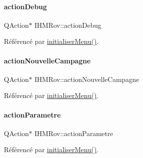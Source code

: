 \mbox{\label{class_i_h_m_rov_abf3ebd717e5d59355dd271917962083f}} 
\paragraph{\texorpdfstring{action\+Debug}{actionDebug}}
{\footnotesize\ttfamily Q\+Action$\ast$ I\+H\+M\+Rov\+::action\+Debug\hspace{0.3cm}{\ttfamily [private]}}



Référencé par \hyperlink{class_i_h_m_rov_aebbcb2325c2d1a88a012d8408e2d6223}{initialiser\+Menu()}.

\mbox{\label{class_i_h_m_rov_a1ea738e5224f6fa4fc61ac064b5d9a6e}} 
\paragraph{\texorpdfstring{action\+Nouvelle\+Campagne}{actionNouvelleCampagne}}
{\footnotesize\ttfamily Q\+Action$\ast$ I\+H\+M\+Rov\+::action\+Nouvelle\+Campagne\hspace{0.3cm}{\ttfamily [private]}}



Référencé par \hyperlink{class_i_h_m_rov_aebbcb2325c2d1a88a012d8408e2d6223}{initialiser\+Menu()}.

\mbox{\label{class_i_h_m_rov_aa1864bc274cc5662b212a3530255e4ad}} 
\paragraph{\texorpdfstring{action\+Parametre}{actionParametre}}
{\footnotesize\ttfamily Q\+Action$\ast$ I\+H\+M\+Rov\+::action\+Parametre\hspace{0.3cm}{\ttfamily [private]}}



Référencé par \hyperlink{class_i_h_m_rov_aebbcb2325c2d1a88a012d8408e2d6223}{initialiser\+Menu()}.

